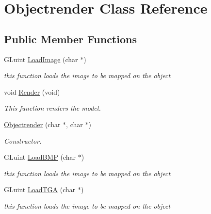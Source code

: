 \hypertarget{classObjectrender}{\section{\-Objectrender \-Class \-Reference}
\label{classObjectrender}
}
\subsection*{\-Public \-Member \-Functions}
\begin{DoxyCompactItemize}
\item 
\-G\-Luint \hyperlink{classObjectrender_ad04f71768f580fd73c0a82bee7b32141}{\-Load\-Image} (char $\ast$)
\begin{DoxyCompactList}\small\item\em this function loads the image to be mapped on the object \end{DoxyCompactList}\item 
void \hyperlink{classObjectrender_ab83ec5db3a519e9017a9e3f1457333af}{\-Render} (void)
\begin{DoxyCompactList}\small\item\em \-This function renders the model. \end{DoxyCompactList}\item 
\hyperlink{classObjectrender_a886459d5d6e8981679a28d8563a898fa}{\-Objectrender} (char $\ast$, char $\ast$)
\begin{DoxyCompactList}\small\item\em \-Constructor. \end{DoxyCompactList}\item 
\-G\-Luint \hyperlink{classObjectrender_abcc4f80f7a14aa2fd94b641c3999560f}{\-Load\-B\-M\-P} (char $\ast$)
\begin{DoxyCompactList}\small\item\em this function loads the image to be mapped on the object \end{DoxyCompactList}\item 
\-G\-Luint \hyperlink{classObjectrender_ab36f65563273565d67ebe3f42a71cd38}{\-Load\-T\-G\-A} (char $\ast$)
\begin{DoxyCompactList}\small\item\em this function loads the image to be mapped on the object \end{DoxyCompactList}\end{DoxyCompactItemize}
